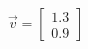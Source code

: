 \documentclass[preview]{standalone}
\begin{document}
\begin{align*}
\vec{v}=\begin{bmatrix}1.3\\0.9\end{bmatrix}
\end{align*}
\end{document}
